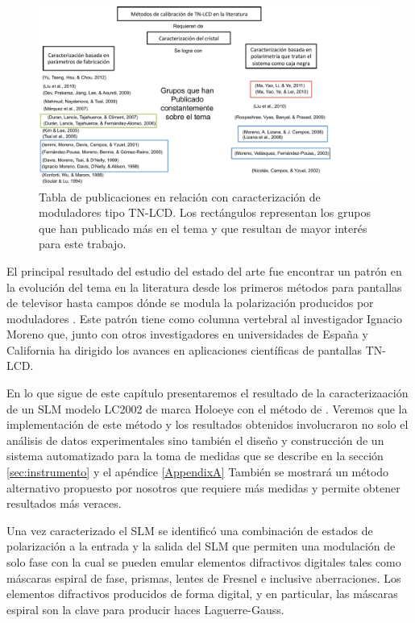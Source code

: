 \begin{figure}[h!]
\centering
\includegraphics[scale=.6]{articulos_metodos}
\caption[Publicaciones en relación a la caracterización de TN-LCD]{Tabla de publicaciones en relación con caracterización de
  moduladores tipo TN-LCD. Los rectángulos representan los grupos que
  han publicado más en el tema y que resultan de mayor interés para
  este trabajo. }
\label{fig:articulos_metodos}
\end{figure}
El principal resultado del estudio del estado del arte fue encontrar
un patrón en la evolución del tema en la literatura desde los primeros
métodos para pantallas de televisor  hasta campos
dónde se modula la polarización producidos por moduladores
. Este patrón tiene como columna vertebral al 
investigador Ignacio Moreno que, junto con otros investigadores en
universidades de España y California ha dirigido los avances en aplicaciones
científicas de pantallas TN-LCD. 

En lo que sigue de este capítulo presentaremos el resultado de la
caracterizaación de un SLM modelo LC2002 de marca Holoeye con el
método de .
Veremos que la implementación de este método y los resultados
obtenidos involucraron no solo el análisis de datos experimentales sino también el diseño y
construcción de un sistema automatizado para la toma de medidas que se
describe en la sección \ref{sec:instrumento} y el apéndice \ref{AppendixA} 
También se mostrará un método alternativo propuesto por nosotros que
requiere más medidas y permite obtener resultados más veraces. 

Una vez caracterizado el SLM se identificó una combinación de estados
de polarización a la entrada y la salida del SLM que permiten una
modulación de solo fase con la cual se pueden emular elementos
difractivos digitales tales como máscaras espiral de fase, prismas,
lentes de Fresnel e inclusive aberraciones. Los elementos difractivos
producidos de forma digital, y en particular, las máscaras espiral 
 son la clave para producir haces Laguerre-Gauss.  

